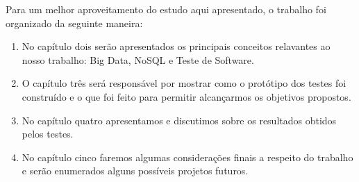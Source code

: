 Para um melhor aproveitamento do estudo aqui apresentado, o trabalho foi organizado da seguinte maneira:

\begin{enumerate}

\item No capítulo dois serão apresentados os principais conceitos relavantes ao nosso trabalho: Big Data, NoSQL e Teste de Software.

\item O capítulo três será responsável por mostrar como o protótipo dos testes foi construído e o que foi feito para permitir alcançarmos os objetivos propostos.

\item No capítulo quatro  apresentamos e discutimos sobre os resultados obtidos pelos testes.

\item No capítulo cinco faremos algumas considerações finais a respeito do trabalho e serão enumerados alguns possíveis projetos futuros.

\end{enumerate}

